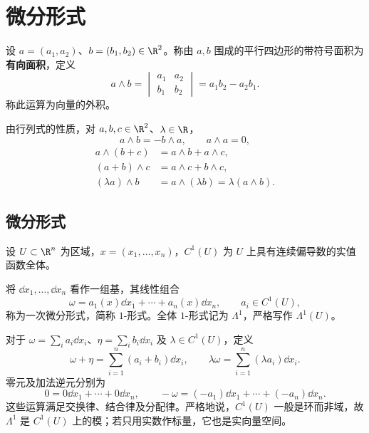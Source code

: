 \section{微分形式}

\begin{definition}[向量的外积与有向面积]
设 $a=(a_1,a_2)$、$b=(b_1,b_2)\in\R^2$。称由 $a,b$ 围成的平行四边形的带符号面积为\textbf{有向面积}，定义
\[
a\wedge b=\begin{vmatrix}a_1&a_2\\b_1&b_2\end{vmatrix}=a_1b_2-a_2b_1.
\]
称此运算为向量的外积。
\end{definition}

由行列式的性质，对 $a,b,c\in\R^2$、$\lambda\in\R$，
\[
a\wedge b=-b\wedge a,\qquad a\wedge a=0,
\]
\[
\begin{aligned}
a\wedge(b+c)&=a\wedge b+a\wedge c,\\
(a+b)\wedge c&=a\wedge c+b\wedge c,\\
(\lambda a)\wedge b&=a\wedge(\lambda b)=\lambda(a\wedge b).
\end{aligned}
\]

\subsection*{微分形式}

设 $U\subset\R^n$ 为区域，$x=(x_1,\ldots,x_n)$，$C^1(U)$ 为 $U$ 上具有连续偏导数的实值函数全体。

\begin{definition}[一次微分形式]
将 $\dd x_1,\ldots,\dd x_n$ 看作一组基，其线性组合
\[
\omega=a_1(x)\dd x_1+\cdots+a_n(x)\dd x_n,
\qquad a_i\in C^1(U),
\]
称为一次微分形式，简称 $1$-形式。全体 $1$-形式记为 $\Lambda^1$，严格写作 $\Lambda^1(U)$。
\end{definition}

对于 $\omega=\sum_i a_i\dd x_i$、$\eta=\sum_i b_i\dd x_i$ 及 $\lambda\in C^1(U)$，定义
\[
\omega+\eta=\sum_{i=1}^n(a_i+b_i)\dd x_i,\qquad
\lambda\omega=\sum_{i=1}^n(\lambda a_i)\dd x_i.
\]
零元及加法逆元分别为
\[
0=0\dd x_1+\cdots+0\dd x_n,\qquad
-\omega=(-a_1)\dd x_1+\cdots+(-a_n)\dd x_n.
\]
这些运算满足交换律、结合律及分配律。严格地说，$C^1(U)$ 一般是环而非域，故 $\Lambda^1$ 是 $C^1(U)$ 上的模；若只用实数作标量，它也是实向量空间。

